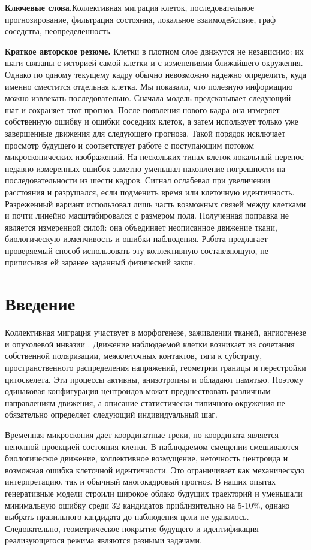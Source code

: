 \documentclass[11pt,a4paper]{article}
\begin{document}
\vspace{2mm}
\noindent\textbf{Ключевые слова.}\enspace Коллективная миграция клеток, последовательное прогнозирование, фильтрация состояния, локальное взаимодействие, граф соседства, неопределенность.

\vspace{2mm}
\noindent\textbf{Краткое авторское резюме.}\enspace
Клетки в плотном слое движутся не независимо: их шаги связаны с историей самой клетки и с изменениями ближайшего окружения. Однако по одному текущему кадру обычно невозможно надежно определить, куда именно сместится отдельная клетка. Мы показали, что полезную информацию можно извлекать последовательно. Сначала модель предсказывает следующий шаг и сохраняет этот прогноз. После появления нового кадра она измеряет собственную ошибку и ошибки соседних клеток, а затем использует только уже завершенные движения для следующего прогноза. Такой порядок исключает просмотр будущего и соответствует работе с поступающим потоком микроскопических изображений. На нескольких типах клеток локальный перенос недавно измеренных ошибок заметно уменьшал накопление погрешности на последовательности из шести кадров. Сигнал ослабевал при увеличении расстояния и разрушался, если подменить время или клеточную идентичность. Разреженный вариант использовал лишь часть возможных связей между клетками и почти линейно масштабировался с размером поля. Полученная поправка не является измеренной силой: она объединяет неописанное движение ткани, биологическую изменчивость и ошибки наблюдения. Работа предлагает проверяемый способ использовать эту коллективную составляющую, не приписывая ей заранее заданный физический закон.

\section{Введение}
Коллективная миграция участвует в морфогенезе, заживлении тканей, ангиогенезе и опухолевой инвазии \cite{ref1,ref2,ref3,ref4}. Движение наблюдаемой клетки возникает из сочетания собственной поляризации, межклеточных контактов, тяги к субстрату, пространственного распределения напряжений, геометрии границы и перестройки цитоскелета. Эти процессы активны, анизотропны и обладают памятью. Поэтому одинаковая конфигурация центроидов может предшествовать различным направлениям движения, а описание статистически типичного окружения не обязательно определяет следующий индивидуальный шаг.

Временная микроскопия дает координатные треки, но координата является неполной проекцией состояния клетки. В наблюдаемом смещении смешиваются биологическое движение, коллективное возмущение, неточность центроида и возможная ошибка клеточной идентичности. Это ограничивает как механическую интерпретацию, так и обычный многокадровый прогноз. В наших опытах генеративные модели строили широкое облако будущих траекторий и уменьшали минимальную ошибку среди 32 кандидатов приблизительно на 5-10\%, однако выбрать правильного кандидата до наблюдения цели не удавалось. Следовательно, геометрическое покрытие будущего и идентификация реализующегося режима являются разными задачами.
\end{document}

